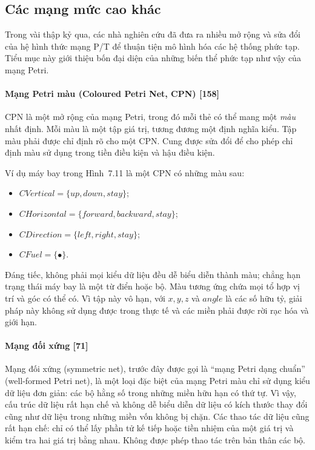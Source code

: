 \subsection{Các mạng mức cao khác}
Trong vài thập kỷ qua, các nhà nghiên cứu đã đưa ra nhiều mở rộng và sửa đổi của hệ hình thức mạng P/T để thuận tiện mô hình hóa các hệ thống phức tạp. Tiểu mục này giới thiệu bốn đại diện của những biến thể phức tạp như vậy của mạng Petri.

\paragraph{Mạng Petri màu (Coloured Petri Net, CPN) [158]}
CPN là một mở rộng của mạng Petri, trong đó mỗi thẻ có thể mang một \emph{màu} nhất định. Mỗi màu là một tập giá trị, tương đương một định nghĩa kiểu. Tập màu phải được chỉ định rõ cho một CPN. Cung được sửa đổi để cho phép chỉ định màu sử dụng trong tiền điều kiện và hậu điều kiện.

Ví dụ máy bay trong Hình~7.11 là một CPN có những màu sau:
\begin{itemize}
\item $CVertical=\{up,down,stay\}$;
\item $CHorizontal=\{forward,backward,stay\}$;
\item $CDirection=\{left,right,stay\}$;
\item $CFuel=\{\bullet\}$.
\end{itemize}
Đáng tiếc, không phải mọi kiểu dữ liệu đều dễ biểu diễn thành màu; chẳng hạn trạng thái máy bay là một từ điển hoặc bộ. Màu tương ứng chứa mọi tổ hợp vị trí và góc có thể có. Vì tập này vô hạn, với $x,y,z$ và $angle$ là các số hữu tỷ, giải pháp này không sử dụng được trong thực tế và các miền phải được rời rạc hóa và giới hạn.

\paragraph{Mạng đối xứng [71]}
Mạng đối xứng (symmetric net), trước đây được gọi là ``mạng Petri dạng chuẩn'' (well-formed Petri net), là một loại đặc biệt của mạng Petri màu chỉ sử dụng kiểu dữ liệu đơn giản: các bộ hằng số trong những miền hữu hạn có thứ tự. Vì vậy, cấu trúc dữ liệu rất hạn chế và không dễ biểu diễn dữ liệu có kích thước thay đổi cũng như dữ liệu trong những miền vốn không bị chặn. Các thao tác dữ liệu cũng rất hạn chế: chỉ có thể lấy phần tử kế tiếp hoặc tiền nhiệm của một giá trị và kiểm tra hai giá trị bằng nhau. Không được phép thao tác trên bản thân các bộ.

